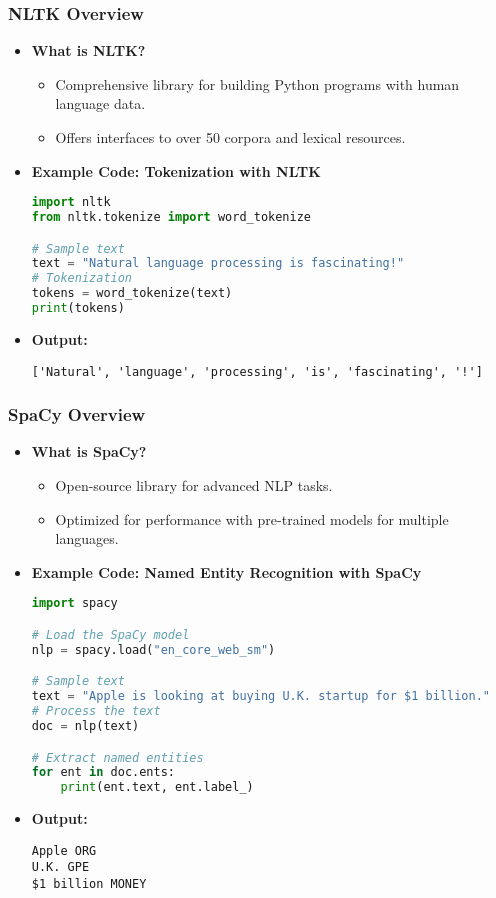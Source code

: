 \documentclass{beamer}
\begin{document}
\begin{frame}[fragile]
    \frametitle{NLTK Overview}
    \begin{itemize}
        \item \textbf{What is NLTK?} 
        \begin{itemize}
            \item Comprehensive library for building Python programs with human language data.
            \item Offers interfaces to over 50 corpora and lexical resources.
        \end{itemize}

        \item \textbf{Example Code: Tokenization with NLTK}
        \begin{lstlisting}[language=Python]
import nltk
from nltk.tokenize import word_tokenize

# Sample text
text = "Natural language processing is fascinating!"
# Tokenization
tokens = word_tokenize(text)
print(tokens)
        \end{lstlisting}

        \item \textbf{Output:}
        \begin{lstlisting}
['Natural', 'language', 'processing', 'is', 'fascinating', '!']
        \end{lstlisting}
    \end{itemize}
\end{frame}

\begin{frame}[fragile]
    \frametitle{SpaCy Overview}
    \begin{itemize}
        \item \textbf{What is SpaCy?} 
        \begin{itemize}
            \item Open-source library for advanced NLP tasks.
            \item Optimized for performance with pre-trained models for multiple languages.
        \end{itemize}

        \item \textbf{Example Code: Named Entity Recognition with SpaCy}
        \begin{lstlisting}[language=Python]
import spacy

# Load the SpaCy model
nlp = spacy.load("en_core_web_sm")

# Sample text
text = "Apple is looking at buying U.K. startup for $1 billion."
# Process the text
doc = nlp(text)

# Extract named entities
for ent in doc.ents:
    print(ent.text, ent.label_)
        \end{lstlisting}

        \item \textbf{Output:}
        \begin{lstlisting}
Apple ORG
U.K. GPE
$1 billion MONEY
        \end{lstlisting}
    \end{itemize}
\end{frame}
\end{document}
